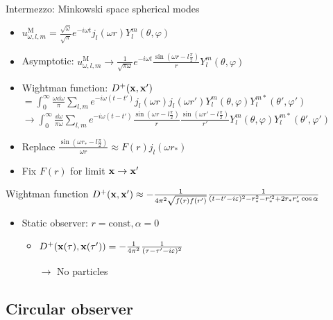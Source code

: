 \documentclass{beamer}
\let\todox\todo
\renewcommand\todo[1]{\todox[inline]{#1}}
\newcommand{\upd}[1]{^\mathrm{#1}}
\begin{document}
\begin{frame}{Intermezzo: Minkowski space spherical modes}
\todo{image}
\begin{itemize}
	\item \(u_{\omega,l,m}\upd{M} = \frac{\sqrt{\omega}}{\sqrt{\pi}} e^{- i \omega t} j_l(\omega r) Y_l^m(\theta,\varphi)\)
	\item Asymptotic: \(u_{\omega,l,m}\upd{M} \to \frac{1}{\sqrt{\pi\omega}} e^{- i \omega t} \frac{\sin(\omega r - l\frac{\pi}{2})}{r} Y_l^m(\theta,\varphi)\)
	\item Wightman function: \(D^+(\vb{x},\vb{x}')\)
	\(= \int_0^\infty \frac{\omega \dd{\omega}}{\pi} \sum_{l,m} e^{-i\omega(t-t')} j_l(\omega r) j_l(\omega r')  Y_l^m(\theta,\varphi) Y_l^{m*}(\theta',\varphi')\)\\
	\(\to \int_0^\infty \frac{\dd{\omega}}{\pi\omega} \sum_{l,m} e^{-i\omega(t-t')} \frac{\sin(\omega r - l\frac{\pi}{2})}{r} \frac{\sin(\omega r' - l\frac{\pi}{2})}{r'} Y_l^m(\theta,\varphi) Y_l^{m*}(\theta',\varphi')\)
\end{itemize}
\end{frame}

\begin{frame}
\begin{itemize}
	\item Replace \(\frac{\sin(\omega r_* - l\frac{\pi}{2})}{\omega r} \approx F(r) j_l(\omega r_*)\)
	\item Fix \(F(r)\) for limit \(\vb{x} \to \vb{x}'\)
\end{itemize}
\begin{block}{Wightman function}
	\(D^+(\vb{x}, \vb{x}') \approx -\frac{1}{4\pi^2 \sqrt{f(r)f(r')}} \frac{1}{(t-t'-i\varepsilon)^2 - r_*^2 - r_*'^2 + 2r_*r_*' \cos{\alpha}}\)
\end{block}
\begin{itemize}
	\item Static observer: \(r = \mathrm{const}, \alpha = 0\)
	\begin{itemize}
		\item \(D^+(\vb{x}(\tau), \vb{x}(\tau')) =  -\frac{1}{4\pi^2} \frac{1}{(\tau-\tau'-i\varepsilon)^2}\)
		\item[\(\to\)] No particles
	\end{itemize}
\end{itemize}
\end{frame}

\subsection{Circular observer}
\end{document}
